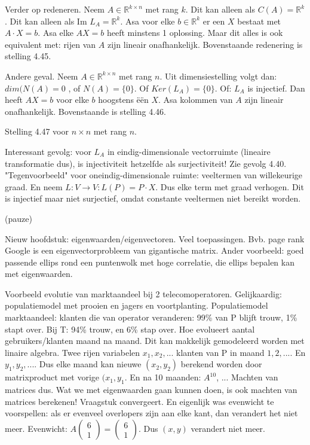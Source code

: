 \documentclass{article}
\begin{document}
Verder op redeneren. Neem $A \in \mathbb{R}^{k \times n}$ met rang $k$. Dit kan alleen als $C(A) =\mathbb{R}^{k} $. Dit kan alleen als $ \text{Im } L_A = \mathbb{R}^{k}$. Asa voor elke $b \in  \mathbb{R}^{k}$ er een $X$ bestaat met $A \cdot X = b$. Asa elke $AX=b$ heeft minstens 1 oplossing. 
Maar dit alles is ook equivalent met: rijen van $A$ zijn lineair onafhankelijk. Bovenstaande redenering is stelling 4.45. 

Andere geval. Neem $A \in \mathbb{R}^{k \times n}$ met rang $n$.
Uit dimensiestelling volgt dan: $dim(N(A)=0$ , of $N(A)=\{ 0 \}$. Of $Ker (L_A) = \{ 0 \}$. Of: $L_A$ is injectief. Dan heeft $AX=b$ voor elke $b$ hoogstens \"e\"en $X$. Asa kolommen van $A$ zijn lineair onafhankelijk. Bovenstaande is stelling 4.46. 

Stelling 4.47 voor $n \times n$ met rang $n$. 

Interessant gevolg: voor $L_A$ in eindig-dimensionale vectorruimte (lineaire transformatie dus), is injectiviteit hetzelfde als surjectiviteit! Zie gevolg 4.40. 
"Tegenvoorbeeld" voor oneindig-dimensionale ruimte: veeltermen van willekeurige graad. En neem $L: V \to V: L(P) = P \cdot X$. Dus elke term met graad verhogen. Dit is injectief maar niet surjectief, omdat constante veeltermen niet bereikt worden. 

(pauze) 

Nieuw hoofdstuk: eigenwaarden/eigenvectoren. Veel toepassingen. Bvb. page rank Google is een eigenvectorprobleem van gigantische matrix. Ander voorbeeld: goed passende ellips rond een puntenwolk met hoge correlatie, die ellips bepalen kan met eigenwaarden. 

Voorbeeld evolutie van marktaandeel bij 2 telecomoperatoren. Gelijkaardig: populatiemodel met prooien en jagers en voortplanting. Populatiemodel marktaandeel: klanten die van operator veranderen: 99\% van P blijft trouw, 1\% stapt over. Bij T: 94\% trouw, en 6\% stap over. Hoe evolueert aantal gebruikers/klanten maand na maand. Dit kan makkelijk gemodeleerd worden met linaire algebra. Twee rijen variabelen $x_1, x_2, ...$ klanten van P in maand $1, 2, ...$. En $y_1, y_2, ...$. Dus elke maand kan nieuwe $(x_2, y_2)$ berekend worden door matrixproduct met vorige $(x_1, y_1$. En na 10 maanden: $A^10$, ... Machten van matrices dus. Wat we met eigenwaarden gaan kunnen doen, is ook machten van matrices berekenen! 
Vraagstuk convergeert. En eigenlijk was evenwicht te voorspellen: als er evenveel overlopers zijn aan elke kant, dan verandert het niet meer. Evenwicht: $A \begin{pmatrix} 6 \\ 1\end{pmatrix} = \begin{pmatrix}  6 \\ 1 \end{pmatrix}$. Dus $(x,y)$ verandert niet meer. 
\end{document}
